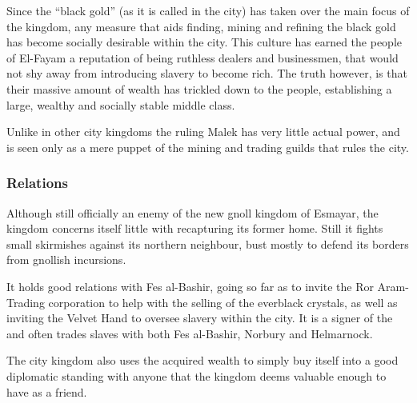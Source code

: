 Since the ``black gold'' (as it is called in the city) has taken over the main
focus of the kingdom, any measure that aids finding, mining and refining the
black gold has become socially desirable within the city. This culture has
earned the people of El-Fayam a reputation of being ruthless dealers and
businessmen, that would not shy away from introducing slavery to become rich.
The truth however, is that their massive amount of wealth has trickled down
to the people, establishing a large, wealthy and socially stable middle class.

Unlike in other city kingdoms the ruling Malek has very little actual power,
and is seen only as a mere puppet of the mining and trading guilds that
rules the city.


\subsubsection{Relations}

Although still officially an enemy of the new gnoll kingdom of Esmayar, the
kingdom concerns itself little with recapturing its former home. Still it
fights small skirmishes against its northern neighbour, bust mostly to
defend its borders from gnollish incursions.

It holds good relations with Fes al-Bashir, going so far as to invite the Ror
Aram-Trading corporation to help with the selling of the everblack crystals,
as well as inviting the Velvet Hand to oversee slavery within the city. It is
a signer of the  and often trades slaves with both
Fes al-Bashir, Norbury and Helmarnock.

The city kingdom also uses the acquired wealth to simply buy itself into
a good diplomatic standing with anyone that the kingdom deems valuable enough
to have as a friend.
